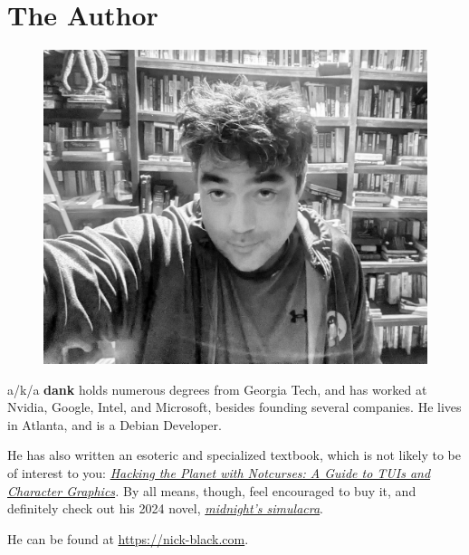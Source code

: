 \clearpage
\openany
\pagestyle{empty}
\chapter{The Author}
\begin{figure}[!tbp]
  \centering
  \includegraphics[width=\textwidth]{images/arrayfire.jpg}
\end{figure}
\bigskip
\begin{center}
\end{center}
\noindent\textbf{\theauthor} a/k/a \textbf{dank} holds numerous degrees from Georgia Tech, and has worked
at Nvidia, Google, Intel, and Microsoft, besides founding several companies.
He lives in Atlanta, and is a Debian Developer.

He has also written an esoteric and specialized textbook, which is not
 likely to be of interest to you: \textit{\href{https://www.amazon.com/Hacking-Planet-Notcurses-Character-Graphics/dp/B086PNVNC9}{Hacking the Planet with Notcurses: A Guide to TUIs and Character Graphics}.}
By all means, though, feel encouraged to buy it,
 and definitely check out his 2024 novel, \textit{\href{https://www.amazon.com/midnights-simulacra-Nick-Black/dp/B0CSVJZB4R}{midnight's simulacra}}.

\bigskip\noindent{}He can be found at \url{https://nick-black.com}.
